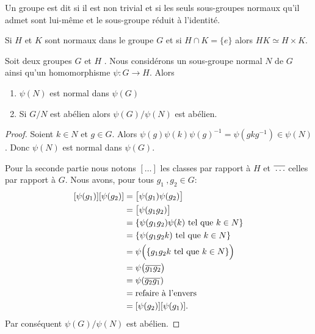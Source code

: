 \begin{definition}   \label{DefGroupeSimple}
    Un groupe est dit  si il est non trivial et si les seuls sous-groupes normaux qu'il admet sont lui-même et le sous-groupe réduit à l'identité.
\end{definition}

\begin{lemma}\label{LemHUkMxp}
    Si \( H\) et \( K\) sont normaux dans le groupe \( G\) et si \( H\cap K=\{ e \}\) alors \( HK\simeq H\times K\).
\end{lemma}

\begin{proposition} \label{PropSRMJooIDPBoW}
    Soit deux groupes \( G\) et \( H \) . Nous considérons un sous-groupe normal \( N\) de \( G\) ainsi qu'un homomorphisme \( \psi\colon G\to H\). Alors
    \begin{enumerate}
        \item
            \( \psi(N)\) est normal dans \( \psi(G)\)
        \item
            Si \( G/N\) est abélien alors \( \psi(G)/\psi(N)\) est abélien.
    \end{enumerate}
\end{proposition}

\begin{proof}
    Soient \( k\in N\) et \( g\in G\). Alors \( \psi(g)\psi(k)\psi(g)^{-1}=\psi(gkg^{-1})\in\psi(N)\). Donc \( \psi(N)\) est normal dans \( \psi(G)\).

    Pour la seconde partie nous notons \( [\ldots]\) les classes par rapport à \( H\) et \( \overline{ \vphantom{g}\ldots }\) celles par rapport à \( G\). Nous avons, pour tous \( g_1\ , g_2 \in G\):
    \begin{subequations}
        \begin{align}
            [\psi(g_1)][\psi(g_2)]&=\big[ \psi(g_1)\psi(g_2) \big]\\
            &=\big[ \psi(g_1g_2) \big]\\
            &=\{ \psi(g_1g_2)\psi(k)\text{ tel que } k\in N \}\\
            &=\{ \psi(g_1g_2k)\text{ tel que } k\in N \}\\
            &=\psi\Big(  \{ g_1g_2k\text{ tel que } k\in N \}  \Big) \\
            &=\psi\big( \overline{ g_1g_2 } \big)\\
            &=\psi(\overline{ g_2g_1 })\\
            &=\text{refaire à l'envers}\\
            &=[\psi(g_2)][\psi(g_1)].
        \end{align}
    \end{subequations}
    Par conséquent \( \psi(G)/\psi(N)\) est abélien.
\end{proof}


